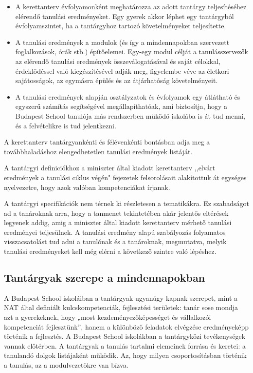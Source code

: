 \begin{itemize}

      \item A kerettanterv évfolyamonként meghatározza az adott tantárgy teljesítéséhez elérendő tanulási eredményeket. Egy gyerek akkor  léphet egy tantárgyból évfolyamszintet, ha a tantárgyhoz tartozó követelményeket teljesítette.

      \item A tanulási eredmények a modulok (és így a mindennapokban szervezett foglalkozások, órák stb.) építőelemei. Egy-egy modul célját a  tanulásszervezők az elérendő tanulási eredmények	összeválogatásával és saját célokkal, érdeklődéssel való	kiegészítésével adják meg, figyelembe véve az életkori  sajátosságok, az egymásra épülés és az átjárhatóság  követelményeit.
      \item A tanulási eredmények alapján osztályzatok és évfolyamok egy átlátható és egyszerű számítás segítségével megállapíthatóak, ami biztosítja, hogy a Budapest  School tanulója más rendszerben működő iskolába is át tud menni, és a felvételikre is tud jelentkezni.
\end{itemize}

A kerettanterv tantárgyankénti és félévenkénti bontásban adja meg a továbbhaladáshoz elengedhetetlen tanulási eredmények listáját.

A tantárgyi definiciókhoz a miniszter által kiadott kerettanterv ,,elvárt eredmények a tanulási ciklus végén" fejezetek felsorolásait alakítottuk át egységes nyelvezetre, hogy azok valóban kompetenciákat írjanak.

A tantárgyi specifikációk nem térnek ki rész\-letesen a tematikákra. Ez szabadságot ad a tanároknak arra, hogy a tanmenet tekintetében akár jelentős eltérések legyenek addig, amig a miniszter által kiadott kerettanterv mérhető tanulási eredményei teljesülnek. A tanulási eredmény alapú szabályozás folyamatos visszacsatolást tud adni a tanulónak és a tanároknak, megmutatva, melyik tanulási eredményeket kell még elérni a következő szintre való lépéshez.

\subsection{Tantárgyak szerepe a mindennapokban}
A Budapest School iskoláiban a tantárgyak ugyanúgy kapnak szerepet, mint a NAT által definiált kulcskompetenciák, fejlesztési területek: tanár sose mondja azt a gyerekeknek, hogy „most kezdeményezőképességet és vállalkozói kompetenciát fejlesztünk'', hanem a különböző feladatok elvégzése eredményeképp történik a fejlesztés. A Budapest School iskolákban a tantárgyközi tevékenységek vannak előtérben. A tantárgyak a tanulás tartalmi elemeinek forrása és keretei: a tanulandó dolgok listájaként működik. Az, hogy milyen csoportosításban történik a tanulás, az a modulvezetőkre van bízva.


